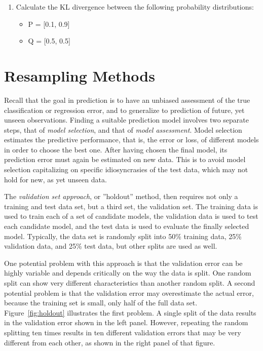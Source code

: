 \begin{tcolorbox}[colback=code]
\begin{enumerate}
\vspace{.5\baselineskip}
  \item Calculate the KL divergence between the following probability distributions:
  \begin{itemize}
     \item P = [0.1, 0.9]
     \item Q = [0.5, 0.5]
  \end{itemize}

\end{enumerate}
\end{tcolorbox}

\section{Resampling Methods}

Recall that the goal in prediction is to have an unbiased assessment of the true classification or regression error, and to generalize to prediction of future, yet unseen observations. Finding a suitable prediction model involves two separate steps, that of \emph{model selection}, and that of \emph{model assessment}. Model selection estimates the predictive performance, that is, the error or loss, of different models in order to choose the best one. After having chosen the final model, its prediction error must again be estimated on new data. This is to avoid model selection capitalizing on specific idiosyncrasies of the test data, which may not hold for new, as yet unseen data.

The \emph{validation set approach}, or ''holdout'' method, then requires not only a training and test data set, but a third set, the validation set. The training data is used to train each of a set of candidate models, the validation data is used to test each candidate model, and the test data is used to evaluate the finally selected model. Typically, the data set is randomly split into 50\% training data, 25\% validation data, and 25\% test data, but other splits are used as well. 

One potential problem with this approach is that the validation error can be highly variable and depends critically on the way the data is split. One random split can show very different characteristics than another random split. A second potential problem is that the validation error may overestimate the actual error, because the training set is small, only half of the full data set. Figure~\ref{fig:holdout} illustrates the first problem. A single split of the data results in the validation error shown in the left panel. However, repeating the random splitting ten times results in ten different validation errors that may be very different from each other, as shown in the right panel of that figure.

